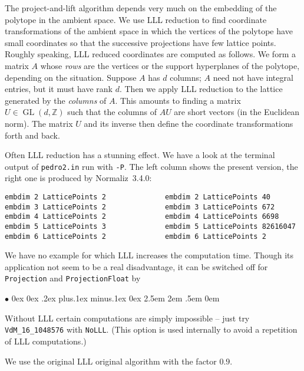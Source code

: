 \documentclass[12pt,a4paper]{scrartcl}
\newcommand{\stdli}{ \topsep0ex \partopsep0ex %
\parsep.2ex plus.1ex minus.1ex \itemsep0ex%
\leftmargin2.5em \labelwidth2em \labelsep.5em \rightmargin0em}%
\renewenvironment{itemize}{\begin{list}{{$\bullet$}}{\stdli}}{\end{list}}
\theoremstyle{definition}
\def\ZZ{{\mathbb Z}}
\def\itemtt[#1]{\item[\textbf{\ttt{#1}}]}
\def\ttt{\texttt}
\begin{document}
The project-and-lift algorithm depends very much on the embedding of the polytope in the ambient space. We use LLL reduction to find coordinate transformations of the ambient space in which the vertices of the polytope have small coordinates so that the successive projections have few lattice points. Roughly speaking, LLL reduced coordinates are computed as follows. We form a matrix $A$ whose \emph{rows} are the vertices or the support hyperplanes of the polytope, depending on the situation. Suppose $A$ has $d$ columns; $A$ need not have integral entries, but it must have rank $d$. Then we apply LLL reduction to the lattice generated by the \emph{columns} of $A$. This amounts to finding a matrix $U\in \operatorname{GL}(d,\ZZ)$ such that the columns of $AU$ are short vectors (in the Euclidean norm). The matrix $U$ and its inverse then define the coordinate transformations forth and back.

Often LLL reduction has a stunning effect. We have a look at the terminal output of \verb|pedro2.in| run with \verb|-P|. The left column shows the present version, the right one is produced by Normaliz~3.4.0:
\begin{Verbatim}
embdim 2 LatticePoints 2              embdim 2 LatticePoints 40
embdim 3 LatticePoints 2              embdim 3 LatticePoints 672
embdim 4 LatticePoints 2              embdim 4 LatticePoints 6698
embdim 5 LatticePoints 3              embdim 5 LatticePoints 82616047
embdim 6 LatticePoints 2              embdim 6 LatticePoints 2
\end{Verbatim}

We have no example for which LLL increases the computation time. Though its application not seem to be a real disadvantage, it can be switched off for \verb|Projection| and \verb|ProjectionFloat| by
\begin{itemize}
	\itemtt[NoLLL]
\end{itemize}
Without LLL certain computations are simply impossible -- just try \verb|VdM_16_1048576| with \verb|NoLLL|. (This option is used internally to avoid a repetition of LLL computations.)

We use the original LLL original algorithm with the factor $0.9$.
\end{document}
